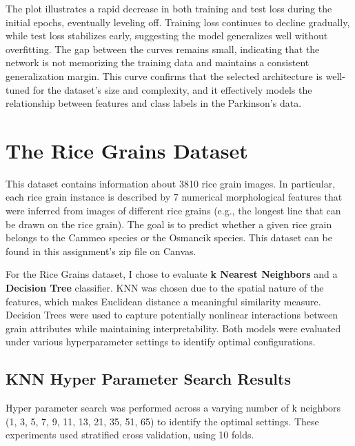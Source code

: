 \documentclass[letterpaper]{article}
\begin{document}
The plot illustrates a rapid decrease in both training and test loss during the initial epochs, eventually leveling off. Training loss continues to decline gradually, while test loss stabilizes early, suggesting the model generalizes well without overfitting. The gap between the curves remains small, indicating that the network is not memorizing the training data and maintains a consistent generalization margin. This curve confirms that the selected architecture is well-tuned for the dataset’s size and complexity, and it effectively models the relationship between features and class labels in the Parkinson’s data.

\clearpage

\section{The Rice Grains Dataset}

This dataset contains information about 3810 rice grain images. In particular, each rice grain instance is described by 7 numerical morphological features that were inferred from images of different rice grains (e.g., the longest line that can be drawn on the rice grain). The goal is to predict whether a given rice grain belongs to the Cammeo species or the Osmancik species. This dataset can be found in this assignment’s zip file on Canvas.

 For the Rice Grains dataset, I chose to evaluate  \textbf{k Nearest Neighbors} and a \textbf{Decision Tree} classifier. KNN was chosen due to the spatial nature of the features, which makes Euclidean distance a meaningful similarity measure. Decision Trees were used to capture potentially nonlinear interactions between grain attributes while maintaining interpretability. Both models were evaluated under various hyperparameter settings to identify optimal configurations.

\subsection{KNN Hyper Parameter Search Results}

    Hyper parameter search was performed across a varying number of k neighbors (1, 3, 5, 7, 9, 11, 13, 21, 35, 51, 65) to identify the optimal settings. These experiments used stratified cross validation, using 10 folds.
\end{document}
